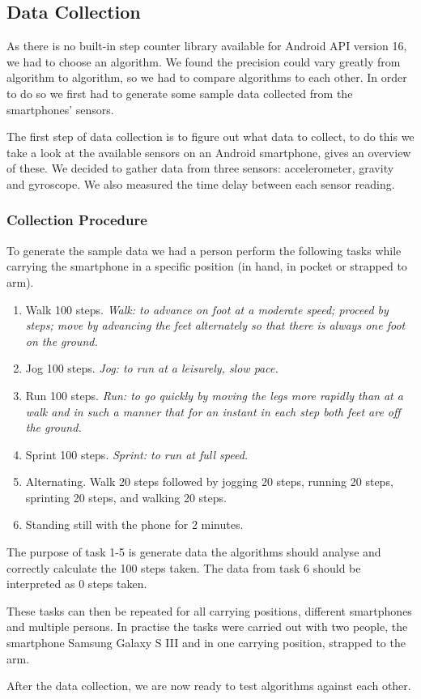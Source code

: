 \subsection{Data Collection}
As there is no built-in step counter library available for Android API version 16, we had to choose an algorithm. We found the precision could vary greatly from algorithm to algorithm, so we had to compare algorithms to each other. In order to do so we first had to generate some sample data collected from the smartphones' sensors. 

The first step of data collection is to figure out what data to collect, to do this we take a look at the available sensors on an Android smartphone, \citet{android:sensor} gives an overview of these. We decided to gather data from three sensors: accelerometer, gravity and gyroscope. We also measured the time delay between each sensor reading.

\subsubsection{Collection Procedure}
To generate the sample data we had a person perform the following tasks while carrying the smartphone in a specific position (in hand, in pocket or strapped to arm). 
\begin{enumerate}
\item Walk 100 steps. \textit{Walk: to advance on foot at a moderate speed; proceed by steps; move by advancing the feet alternately so that there is always one foot on the ground.}\citep[Walk]{dict:reference} %
\item Jog 100 steps. \textit{Jog: to run at a leisurely, slow pace.}\citep[Jog]{dict:reference} %
\item Run 100 steps. \textit{Run: to go quickly by moving the legs more rapidly than at a walk and in such a manner that for an instant in each step both feet are off the ground.}\citep[Run]{dict:reference} %
\item Sprint 100 steps. \textit{Sprint: to run at full speed.}\citep[Sprint]{dict:reference} %
\item Alternating. Walk 20 steps followed by jogging 20 steps, running 20 steps, sprinting 20 steps, and walking 20 steps.
\item Standing still with the phone for 2 minutes.
\end{enumerate}

The purpose of task 1-5 is generate data the algorithms should analyse and correctly calculate the 100 steps taken. The data from task 6 should be interpreted as 0 steps taken.

These tasks can then be repeated for all carrying positions, different smartphones and multiple persons. In practise the tasks were carried out with two people, the smartphone Samsung Galaxy S III and in one carrying position, strapped to the arm.

After the data collection, we are now ready to test algorithms against each other.